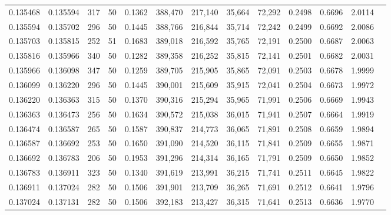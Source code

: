 \begin{tabular}{rrrrrrrrrrrrr}
0.135468 & 0.135594 &   317 &  50 &                                     0.1362 & 388,470 & 217,140 &  35,664 &  72,292 & 0.2498 & 0.6696 & 2.0114 \\
0.135594 & 0.135702 &   296 &  50 &                                     0.1445 & 388,766 & 216,844 &  35,714 &  72,242 & 0.2499 & 0.6692 & 2.0086 \\
0.135703 & 0.135815 &   252 &  51 &                                     0.1683 & 389,018 & 216,592 &  35,765 &  72,191 & 0.2500 & 0.6687 & 2.0063 \\
0.135816 & 0.135966 &   340 &  50 &                                     0.1282 & 389,358 & 216,252 &  35,815 &  72,141 & 0.2501 & 0.6682 & 2.0031 \\
0.135966 & 0.136098 &   347 &  50 &                                     0.1259 & 389,705 & 215,905 &  35,865 &  72,091 & 0.2503 & 0.6678 & 1.9999 \\
0.136099 & 0.136220 &   296 &  50 &                                     0.1445 & 390,001 & 215,609 &  35,915 &  72,041 & 0.2504 & 0.6673 & 1.9972 \\
0.136220 & 0.136363 &   315 &  50 &                                     0.1370 & 390,316 & 215,294 &  35,965 &  71,991 & 0.2506 & 0.6669 & 1.9943 \\
0.136363 & 0.136473 &   256 &  50 &                                     0.1634 & 390,572 & 215,038 &  36,015 &  71,941 & 0.2507 & 0.6664 & 1.9919 \\
0.136474 & 0.136587 &   265 &  50 &                                     0.1587 & 390,837 & 214,773 &  36,065 &  71,891 & 0.2508 & 0.6659 & 1.9894 \\
0.136587 & 0.136692 &   253 &  50 &                                     0.1650 & 391,090 & 214,520 &  36,115 &  71,841 & 0.2509 & 0.6655 & 1.9871 \\
0.136692 & 0.136783 &   206 &  50 &                                     0.1953 & 391,296 & 214,314 &  36,165 &  71,791 & 0.2509 & 0.6650 & 1.9852 \\
0.136783 & 0.136911 &   323 &  50 &                                     0.1340 & 391,619 & 213,991 &  36,215 &  71,741 & 0.2511 & 0.6645 & 1.9822 \\
0.136911 & 0.137024 &   282 &  50 &                                     0.1506 & 391,901 & 213,709 &  36,265 &  71,691 & 0.2512 & 0.6641 & 1.9796 \\
0.137024 & 0.137131 &   282 &  50 &                                     0.1506 & 392,183 & 213,427 &  36,315 &  71,641 & 0.2513 & 0.6636 & 1.9770 \\

\end{tabular}
